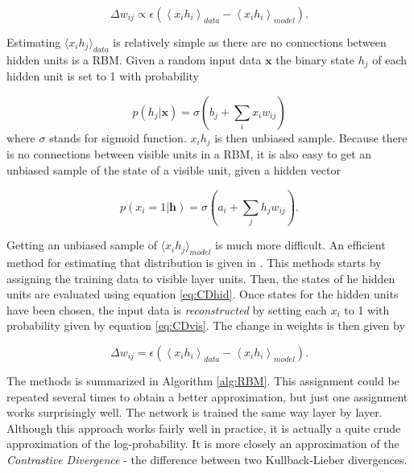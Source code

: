 \begin{equation}
	\Delta w_{ij} \propto \epsilon \left (  \left \langle x_ih_i   \right \rangle_{data} - \left \langle x_ih_i   \right \rangle_{model}   \right ).
\end{equation}

Estimating $ \langle x_ih_j \rangle_{data}$ is relatively simple as there are no connections between hidden units is a RBM. Given a random input data $\mathbf{x}$ the binary state $h_j$ of each hidden unit is set to 1 with probability

\begin{equation}
	p(h_j | \mathbf{x}) = \sigma \left ( b_j + \sum_i x_iw_{ij} \right )
	\label{eq:CDhid}
\end{equation}
where $\sigma$ stands for sigmoid function. $x_ih_j$ is then unbiased sample. Because there is no connections between visible units in a RBM, it is also easy to get an unbiased sample of the state of a visible unit, given a hidden vector

\begin{equation}
	p(x_i=1 | \mathbf{h}) = \sigma \left ( a_i + \sum_jh_jw_{ij} \right ).
	\label{eq:CDvis}
\end{equation}

Getting an unbiased sample of $ \langle x_ih_j \rangle_{model}$ is much more difficult. An efficient method for estimating that distribution is given in \cite{Hinton2002}. This methods starts by assigning the training data to visible layer units. Then, the states of he hidden units are evaluated using equation \ref{eq:CDhid}. Once states for the hidden units have been chosen, the input data is \textit{reconstructed} by setting each $x_i$ to 1 with probability given by equation \ref{eq:CDvis}. The change in weights is then given by 

\begin{equation}
	\Delta w_{ij} = \epsilon \left (  \left \langle x_ih_i   \right \rangle_{data} - \left \langle x_ih_i   \right \rangle_{model}   \right ).
\end{equation}

The methods is summarized in Algorithm \ref{alg:RBM}. This assignment could be repeated several times to obtain a better approximation, but just one assignment works surprisingly well. The network is trained the same way layer by layer. \\

Although this approach works fairly well in practice, it is actually a quite crude approximation of the log-probability. It is more closely an approximation of the \textit{Contrastive Divergence} - the difference between two Kullback-Lieber divergences. \\

